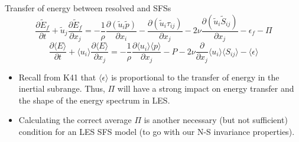 
\begin{frame}{Transfer of energy between resolved and SFSs}
	$$\frac{\partial \tilde E_f}{\partial t} + \tilde u_j\frac{\partial \tilde E_f}{\partial x_j} = -\frac{1}{\rho} \frac{\partial (\tilde u_i \tilde p)}{\partial x_i} - \frac{\partial (\tilde u_i \tau_{ij})}{\partial x_j} - 2\nu\frac{\partial (\tilde u_i \tilde S_{ij})}{\partial x_j}- \epsilon_f -\Pi$$
	$$\frac{\partial \langle E\rangle}{\partial t} + \langle u_i\rangle \frac{\partial \langle E \rangle}{\partial x_j} = -\frac{1}{\rho} \frac{\partial \langle u_i\rangle \langle p \rangle}{\partial x_j} -P - 2\nu\frac{\partial}{\partial x_j} \langle u_i\rangle \langle S_{ij}\rangle - \langle \epsilon \rangle$$
\begin{itemize}
	\item Recall from K41 that $\langle \epsilon \rangle$ is proportional to the transfer of energy in the inertial subrange. Thus, $\Pi$ will have a strong impact on energy transfer and the shape of the energy spectrum in LES.
	\item Calculating the correct average $\Pi$ is another necessary (but not sufficient) condition for an LES SFS model (to go with our N-S invariance properties).
\end{itemize}
\end{frame}





